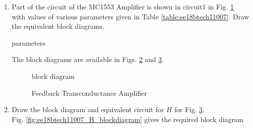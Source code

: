 \begin{enumerate}[label=\thesection.\arabic*.,ref=\thesection.\theenumi]

 \item Part of the circuit of the MC1553 Amplifier is shown in circuit1 in  Fig. \ref{fig:ee18btech11007_circuit1} with values of various parameters given in  Table \ref{table:ee18btech11007}.  Draw the equivalent block diagrams.

\renewcommand{\thefigure}{\theenumi.\arabic{figure}}
 \begin{figure}[!ht]
	\begin{center}
		
		\resizebox{\columnwidth}{!}{}
	\end{center}
\caption{}
\label{fig:ee18btech11007_circuit1}
\end{figure}
 
\begin{table}[!ht]
\centering

\caption{parameters}
\label{table:ee18btech11007}
\end{table}
\solution  The block diagrams are  available in Figs. \ref{fig:ee18btech11007_block_diagram} and 
\ref{fig:ee18btech11007_trans-conductance_blockdiagram}. 
\begin{figure}[!ht]
	\begin{center}
		
		\resizebox{\columnwidth}{!}{}
	\end{center}
\caption{block diagram}
\label{fig:ee18btech11007_block_diagram}
\end{figure}

\begin{figure}[!ht]
	\begin{center}
		
		\resizebox{\columnwidth}{!}{}
	\end{center}
\caption{Feedback Transconductance Amplifier}
\label{fig:ee18btech11007_trans-conductance_blockdiagram}
\end{figure}
\renewcommand{\thefigure}{\theenumi}

\item Draw the block diagram and equivalent circuit for $H$ for Fig. \ref{fig:ee18btech11007_trans-conductance_blockdiagram}.
\\
\solution Fig. \ref{fig:ee18btech11007_H_blockdiagram} gives the required block diagram
\renewcommand{\thefigure}{\theenumi.\arabic{figure}}
\begin{figure}[!ht]
	\begin{center}
		

\end{center}
\end{figure}
\end{enumerate}
